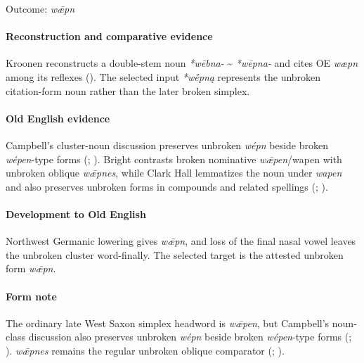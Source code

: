 \documentclass[
  british,
  a4paper,
]{article}
\begin{document}
Outcome: \emph{wǣpn}

\paragraph{Reconstruction and comparative
evidence}\label{reconstruction-and-comparative-evidence-11}

Kroonen reconstructs a double-stem noun \emph{*wēbna-} \textasciitilde{}
\emph{*wēpna-} and cites OE \emph{wæpn} among its reflexes
(). The selected input
\emph{*wḗpną} represents the unbroken citation-form noun rather than the
later broken simplex.

\paragraph{Old English evidence}\label{old-english-evidence-11}

Campbell's cluster-noun discussion preserves unbroken \emph{wépn} beside
broken \emph{wépen}-type forms (; ). Bright
contrasts broken nominative \emph{wǣpen}/wapen with unbroken oblique
\emph{wǣpnes}, while Clark Hall lemmatizes the noun under \emph{wapen}
and also preserves unbroken forms in compounds and related spellings
(;
).

\paragraph{Development to Old
English}\label{development-to-old-english-11}

Northwest Germanic lowering gives \emph{wǣpn}, and loss of the final
nasal vowel leaves the unbroken cluster word-finally. The selected
target is the attested unbroken form \emph{wǣpn}.

\paragraph{Form note}\label{form-note-2}

The ordinary late West Saxon simplex headword is \emph{wǣpen}, but
Campbell's noun-class discussion also preserves unbroken \emph{wépn}
beside broken \emph{wépen}-type forms
(;
). \emph{wǣpnes} remains the
regular unbroken oblique comparator
(;
).
\end{document}
